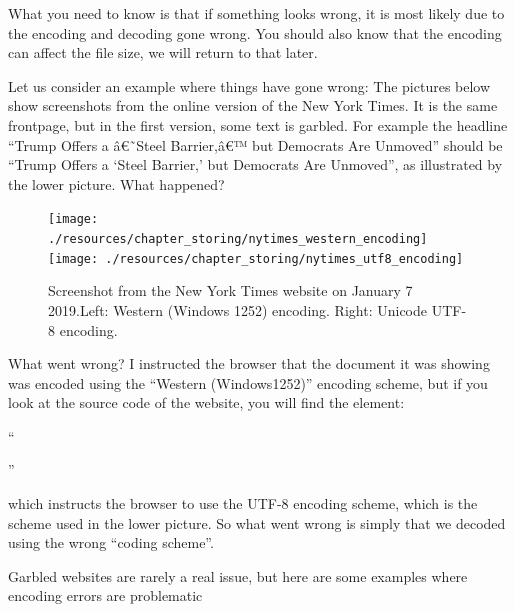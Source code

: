 \documentclass[
]{book}
\begin{document}
What you need to know is that if something looks wrong, it is most likely due to the encoding and decoding gone wrong. You should also know that the encoding can affect the file size, we will return to that later.

Let us consider an example where things have gone wrong: The pictures below show screenshots from the online version of the New York Times. It is the same frontpage, but in the first version, some text is garbled. For example the headline ``Trump Offers a â€˜Steel Barrier,â€™ but Democrats Are Unmoved'' should be ``Trump Offers a `Steel Barrier,' but Democrats Are Unmoved'', as illustrated by the lower picture. What happened?

\begin{figure}

{\centering \texttt{[image: ./resources/chapter\_storing/nytimes\_western\_encoding]} \texttt{[image: ./resources/chapter\_storing/nytimes\_utf8\_encoding]} 

}

\caption{Screenshot from the New York Times website on January 7 2019.Left: Western (Windows 1252) encoding. Right: Unicode UTF-8 encoding.}\label{fig:store3}
\end{figure}

What went wrong? I instructed the browser that the document it was showing was encoded using the ``Western (Windows1252)'' encoding scheme, but if you look at the source code of the website, you will find the element:

``

''

which instructs the browser to use the UTF-8 encoding scheme, which is the scheme used in the lower picture. So what went wrong is simply that we decoded using the wrong ``coding scheme''.

Garbled websites are rarely a real issue, but here are some examples where encoding errors are problematic
\end{document}
